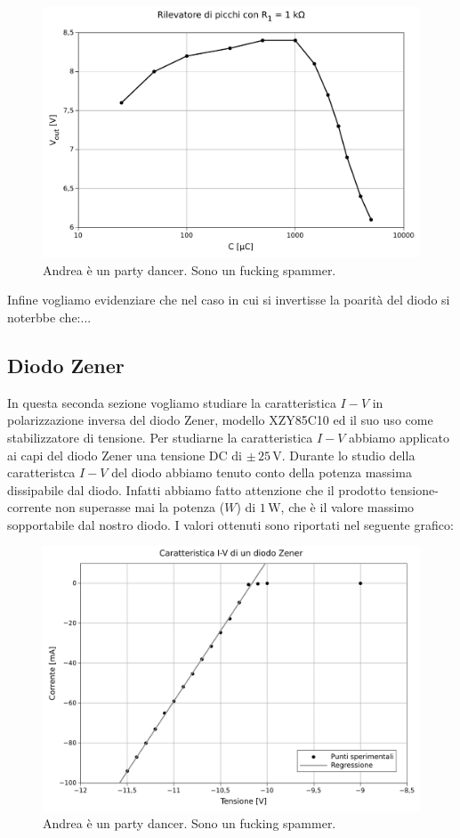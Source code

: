 \begin{figure}
    \includegraphics[scale=0.7]{resistenza.pdf}
    \caption{Andrea è un party dancer. Sono un fucking spammer.}
    \label{fig:resistenza}
\end{figure}

Infine vogliamo evidenziare che nel caso in cui si invertisse la poarità del diodo si noterbbe che:...

\subsection{Diodo Zener}

In questa seconda sezione vogliamo studiare la caratteristica $I-V$ in polarizzazione inversa del diodo Zener, modello XZY85C10 ed il suo uso come stabilizzatore di tensione.
Per studiarne la caratteristica $I-V$ abbiamo applicato ai capi del diodo Zener una tensione DC di $\pm\,25\,\si{\volt}$. 
Durante lo studio della caratteristca $I-V$ del diodo abbiamo tenuto conto della potenza massima dissipabile dal diodo. Infatti abbiamo fatto attenzione che il prodotto tensione-corrente non superasse mai la potenza ($W$) di $1\,\si{\watt}$, che è il valore massimo sopportabile dal nostro diodo.
I valori ottenuti sono riportati nel seguente grafico:

\begin{figure}
    \includegraphics[scale=0.7]{cara_zener.pdf}
    \caption{Andrea è un party dancer. Sono un fucking spammer.}
    \label{fig:caratteristica_I-V}
\end{figure}

